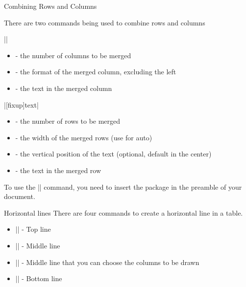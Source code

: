 \begin{frame}[fragile]{Combining Rows and Columns}

There are two commands being used to combine rows and columns
\begin{command}
\LC||

\begin{itemize}
	\item {} - the number of columns to be merged
	\item {} - the format of the merged column, excluding the left \packagename{|}
	\item {} - the text in the merged column
\end{itemize}

\LC|[fixup]{text}|

\begin{itemize}
	\item {} - the number of rows to be merged
	\item {} - the width of the merged rows (use \packagename{*} for auto)
	\item {} - the vertical position of the text (optional, default in the center)
	\item {} - the text in the merged row
\end{itemize}	

\end{command}

To use the \LC|\multirow| command, you need to insert the package  in the preamble of your document.

\end{frame}

\begin{frame}[fragile]{Horizontal lines}
  There are four commands to create a horizontal line in a table.

  \begin{itemize}
    \item \LC|\toprule| - Top line
    \item \LC|\midrule| - Middle line
    \item \LC|| - Middle line that you can choose the columns to be drawn
    \item \LC|\bottomrule| - Bottom line
  \end{itemize}
\end{frame}

